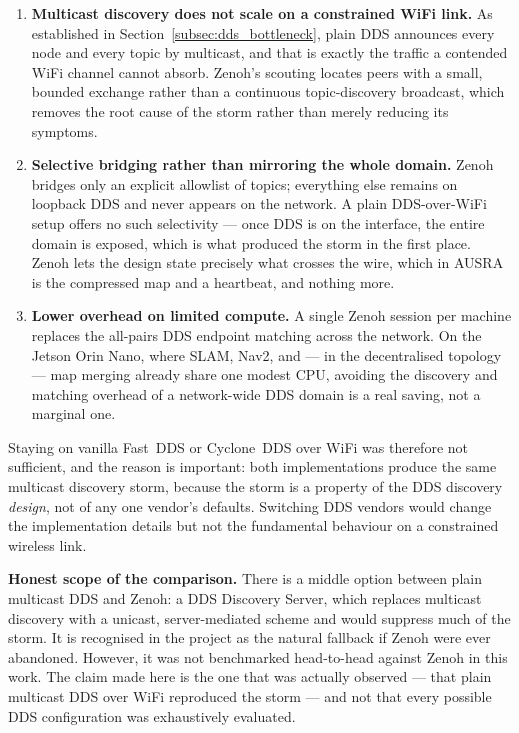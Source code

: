 \begin{enumerate}
    \item \textbf{Multicast discovery does not scale on a constrained WiFi link.} As established in Section~\ref{subsec:dds_bottleneck}, plain DDS announces every node and every topic by multicast, and that is exactly the traffic a contended WiFi channel cannot absorb. Zenoh's scouting locates peers with a small, bounded exchange rather than a continuous topic-discovery broadcast, which removes the root cause of the storm rather than merely reducing its symptoms.
    \item \textbf{Selective bridging rather than mirroring the whole domain.} Zenoh bridges only an explicit allowlist of topics; everything else remains on loopback DDS and never appears on the network. A plain DDS-over-WiFi setup offers no such selectivity --- once DDS is on the interface, the entire domain is exposed, which is what produced the storm in the first place. Zenoh lets the design state precisely what crosses the wire, which in AUSRA is the compressed map and a heartbeat, and nothing more.
    \item \textbf{Lower overhead on limited compute.} A single Zenoh session per machine replaces the all-pairs DDS endpoint matching across the network. On the Jetson Orin Nano, where SLAM, Nav2, and --- in the decentralised topology --- map merging already share one modest CPU, avoiding the discovery and matching overhead of a network-wide DDS domain is a real saving, not a marginal one.
\end{enumerate}

Staying on vanilla Fast~DDS or Cyclone~DDS over WiFi was therefore not sufficient, and the reason is important: both implementations produce the same multicast discovery storm, because the storm is a property of the DDS discovery \emph{design}, not of any one vendor's defaults. Switching DDS vendors would change the implementation details but not the fundamental behaviour on a constrained wireless link.

\begin{notebox}
\textbf{Honest scope of the comparison.} There is a middle option between plain multicast DDS and Zenoh: a DDS Discovery Server, which replaces multicast discovery with a unicast, server-mediated scheme and would suppress much of the storm. It is recognised in the project as the natural fallback if Zenoh were ever abandoned. However, it was not benchmarked head-to-head against Zenoh in this work. The claim made here is the one that was actually observed --- that plain multicast DDS over WiFi reproduced the storm --- and not that every possible DDS configuration was exhaustively evaluated.
\end{notebox}

